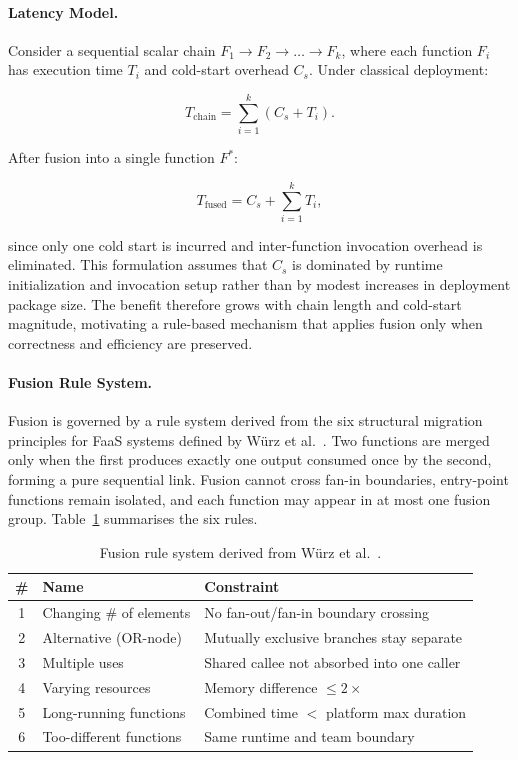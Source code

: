 \documentclass[runningheads]{llncs}
\begin{document}
\paragraph{Latency Model.}

Consider a sequential scalar chain $F_1 \rightarrow F_2 \rightarrow \dots \rightarrow F_k$, where each function $F_i$ has execution time $T_i$ and cold-start overhead $C_s$. Under classical deployment:

\begin{equation}
T_{\text{chain}} = \sum_{i=1}^{k} (C_s + T_i).
\end{equation}

After fusion into a single function $F^{*}$:

\begin{equation}
T_{\text{fused}} = C_s + \sum_{i=1}^{k} T_i,
\end{equation}

since only one cold start is incurred and inter-function invocation overhead is eliminated. This formulation assumes that $C_s$ is dominated by runtime initialization and invocation setup rather than by modest increases in deployment package size. The benefit therefore grows with chain length and cold-start magnitude, motivating a rule-based mechanism that applies fusion only when correctness and efficiency are preserved.

\paragraph{Fusion Rule System.}

Fusion is governed by a rule system derived from the six structural migration principles for FaaS systems defined by W\"{u}rz et al.~\cite{wurz2020migrating}. Two functions are merged only when the first produces exactly one output consumed once by the second, forming a pure sequential link. Fusion cannot cross fan-in boundaries, entry-point functions remain isolated, and each function may appear in at most one fusion group. Table~\ref{tab:fusion-rules} summarises the six rules.

\begin{table}[t]
\caption{Fusion rule system derived from W\"{u}rz et al.~\cite{wurz2020migrating}.}
\label{tab:fusion-rules}
\centering
\small
\begin{tabular}{|c|l|l|}
\hline
\textbf{\#} & \textbf{Name} & \textbf{Constraint} \\
\hline
1 & Changing \# of elements & No fan-out/fan-in boundary crossing \\
2 & Alternative (OR-node) & Mutually exclusive branches stay separate \\
3 & Multiple uses & Shared callee not absorbed into one caller \\
4 & Varying resources & Memory difference $\le 2\times$ \\
5 & Long-running functions & Combined time $<$ platform max duration \\
6 & Too-different functions & Same runtime and team boundary \\
\hline
\end{tabular}
\end{table}
\end{document}
